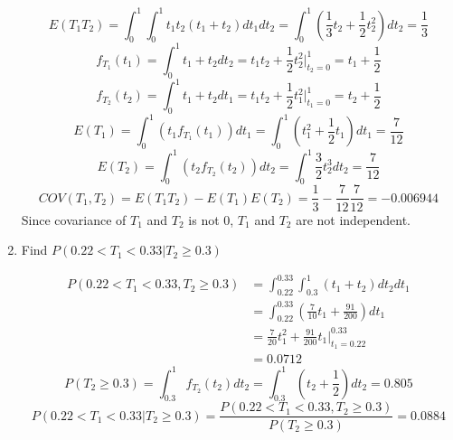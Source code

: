 \documentclass[11pt]{article}
\begin{document}
\begin{enumerate}
  \begin{solution}
    $ $\\
    \[
      E(T_1T_2) = \int_0^1 \int_0^1 t_1t_2(t_1 + t_2)dt_1 dt_2 = \int_0^1 (\frac{1}{3}t_2 + \frac{1}{2}t_2^2) dt_2 = \frac{1}{3}
    \]
    \[
      f_{T_1}(t_1) = \int_0^1 t_1 + t_2 dt_2 = t_1t_2 +  \frac{1}{2}t_2^2 \big|_{t_2 = 0}^1 = t_1 + \frac{1}{2}
    \]
    \[
      f_{T_2}(t_2) = \int_0^1 t_1 + t_2 dt_1 = t_1t_2 +  \frac{1}{2}t_1^2 \big|_{t_1 = 0}^1 = t_2 + \frac{1}{2}
    \]
    \[
      E(T_1) = \int_0^1 (t_1 f_{T_1}(t_1)) dt_1 = \int_0^1 (t_1^2 + \frac{1}{2}t_1) dt_1 = \frac{7}{12}
    \]
    \[
      E(T_2) = \int_0^1 (t_2f_{T_2}(t_2)) dt_2 = \int_0^1 \frac{3}{2} t_2^3 dt_2 = \frac{7}{12}
    \]
    \[
      COV(T_1, T_2) = E(T_1 T_2) - E(T_1)E(T_2) = \frac{1}{3} - \frac{7}{12}\frac{7}{12} = -0.006944
    \]
    Since covariance of $T_1$ and $T_2$ is not 0, $T_1$ and $T_2$ are not independent.
  \end{solution}
  \item  Find $P(0.22< T_1 < 0.33 | T_2\geq 0.3)$
  \begin{solution}
    $ $\\
    \begin{align*}
      P(0.22< T_1 < 0.33, T_2\geq 0.3) &= \int_{0.22}^{0.33} \int_{0.3}^1 (t_1 + t_2) dt_2 dt_1\\
      &= \int_{0.22}^{0.33} (\frac{7}{10}t_1 + \frac{91}{200}) dt_1\\
      &= \frac{7}{20}t_1^2 + \frac{91}{200}t_1 \big|_{t_1 = 0.22}^{0.33}\\
      &= 0.0712
    \end{align*}
    \[
      P(T_2 \geq 0.3) = \int_{0.3}^1 f_{T_2}(t_2) dt_2 = \int_{0.3}^1 (t_2 + \frac{1}{2}) dt_2 = 0.805
    \]
    \[
      P(0.22< T_1 < 0.33 | T_2\geq 0.3) = \frac{P(0.22< T_1 < 0.33, T_2\geq 0.3)}{P(T_2 \geq 0.3)} = 0.0884
    \]
  \end{solution}
\end{enumerate}
\end{document}
